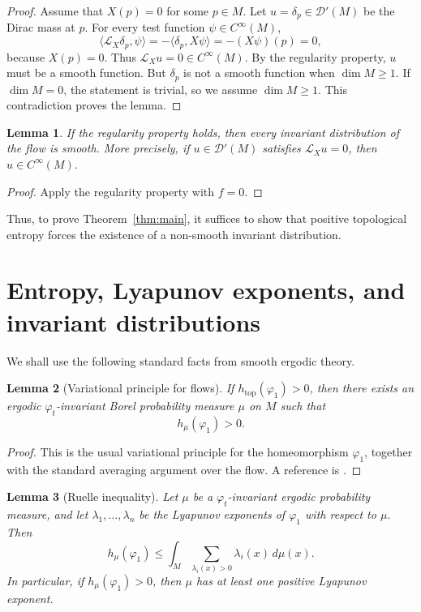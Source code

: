 \documentclass{article}
\newtheorem{lemma}{Lemma}
\theoremstyle{definition}
\newcommand{\cD}{\mathcal{D}}
\newcommand{\cL}{\mathcal{L}}
\begin{document}
\begin{proof}
Assume that $X(p)=0$ for some $p\in M$. Let $u=\delta_p\in\cD'(M)$ be the
Dirac mass at $p$. For every test function $\psi\in C^\infty(M)$,
\[
\langle \cL_X \delta_p,\psi\rangle
=
-\langle \delta_p,X\psi\rangle
=
-(X\psi)(p)
=
0,
\]
because $X(p)=0$. Thus $\cL_X u=0\in C^\infty(M)$. By the regularity
property, $u$ must be a smooth function. But $\delta_p$ is not a smooth
function when $\dim M\ge 1$. If $\dim M=0$, the statement is trivial, so we
assume $\dim M\ge 1$. This contradiction proves the lemma.
\end{proof}

\begin{lemma}\label{lem:invariant-distributions}
If the regularity property holds, then every invariant distribution of the
flow is smooth. More precisely, if $u\in\cD'(M)$ satisfies
$\cL_X u=0$, then $u\in C^\infty(M)$.
\end{lemma}

\begin{proof}
Apply the regularity property with $f=0$.
\end{proof}

Thus, to prove Theorem~\ref{thm:main}, it suffices to show that positive
topological entropy forces the existence of a non-smooth invariant
distribution.

\section{Entropy, Lyapunov exponents, and invariant distributions}

We shall use the following standard facts from smooth ergodic theory.

\begin{lemma}[Variational principle for flows]\label{lem:variational}
If $h_{\mathrm{top}}(\varphi_1)>0$, then there exists an ergodic
$\varphi_t$-invariant Borel probability measure $\mu$ on $M$ such that
\[
h_\mu(\varphi_1)>0.
\]
\end{lemma}

\begin{proof}
This is the usual variational principle for the homeomorphism $\varphi_1$,
together with the standard averaging argument over the flow. A reference is
\cite{KH}.
\end{proof}

\begin{lemma}[Ruelle inequality]\label{lem:ruelle}
Let $\mu$ be a $\varphi_t$-invariant ergodic probability measure, and let
$\lambda_1,\dots,\lambda_n$ be the Lyapunov exponents of $\varphi_1$ with
respect to $\mu$. Then
\[
h_\mu(\varphi_1)
\le
\int_M \sum_{\lambda_i(x)>0} \lambda_i(x)\,d\mu(x).
\]
In particular, if $h_\mu(\varphi_1)>0$, then $\mu$ has at least one positive
Lyapunov exponent.
\end{lemma}
\end{document}
